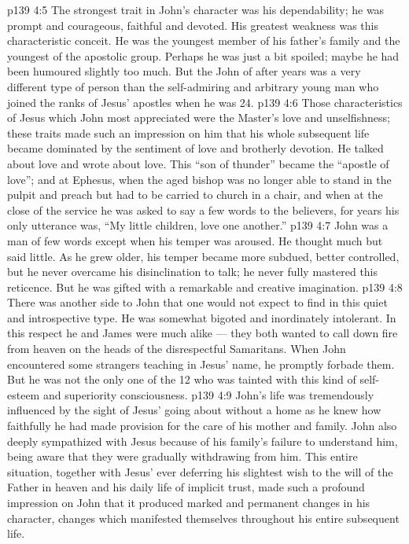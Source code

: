 \vs p139 4:5 The strongest trait in John’s character was his dependability; he was prompt and courageous, faithful and devoted. His greatest weakness was this characteristic conceit. He was the youngest member of his father’s family and the youngest of the apostolic group. Perhaps he was just a bit spoiled; maybe he had been humoured slightly too much. But the John of after years was a very different type of person than the self\hyp{}admiring and arbitrary young man who joined the ranks of Jesus’ apostles when he was 24.
\vs p139 4:6 \pc Those characteristics of Jesus which John most appreciated were the Master’s love and unselfishness; these traits made such an impression on him that his whole subsequent life became dominated by the sentiment of love and brotherly devotion. He talked about love and wrote about love. This “son of thunder” became the “apostle of love”; and at Ephesus, when the aged bishop was no longer able to stand in the pulpit and preach but had to be carried to church in a chair, and when at the close of the service he was asked to say a few words to the believers, for years his only utterance was, “My little children, love one another.”
\vs p139 4:7 \pc John was a man of few words except when his temper was aroused. He thought much but said little. As he grew older, his temper became more subdued, better controlled, but he never overcame his disinclination to talk; he never fully mastered this reticence. But he was gifted with a remarkable and creative imagination.
\vs p139 4:8 \pc There was another side to John that one would not expect to find in this quiet and introspective type. He was somewhat bigoted and inordinately intolerant. In this respect he and James were much alike --- they both wanted to call down fire from heaven on the heads of the disrespectful Samaritans. When John encountered some strangers teaching in Jesus’ name, he promptly forbade them. But he was not the only one of the 12 who was tainted with this kind of self\hyp{}esteem and superiority consciousness.
\vs p139 4:9 John’s life was tremendously influenced by the sight of Jesus’ going about without a home as he knew how faithfully he had made provision for the care of his mother and family. John also deeply sympathized with Jesus because of his family’s failure to understand him, being aware that they were gradually withdrawing from him. This entire situation, together with Jesus’ ever deferring his slightest wish to the will of the Father in heaven and his daily life of implicit trust, made such a profound impression on John that it produced marked and permanent changes in his character, changes which manifested themselves throughout his entire subsequent life.
